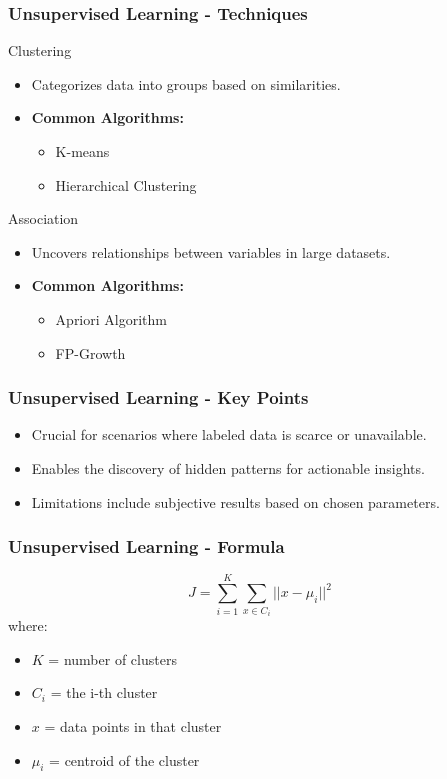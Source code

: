 \documentclass[aspectratio=169]{beamer}
\begin{document}
\begin{frame}[fragile]
    \frametitle{Unsupervised Learning - Techniques}
    \begin{block}{Clustering}
        \begin{itemize}
            \item Categorizes data into groups based on similarities.
            \item \textbf{Common Algorithms:}
            \begin{itemize}
                \item K-means
                \item Hierarchical Clustering
            \end{itemize}
        \end{itemize}
    \end{block}
    
    \begin{block}{Association}
        \begin{itemize}
            \item Uncovers relationships between variables in large datasets.
            \item \textbf{Common Algorithms:}
            \begin{itemize}
                \item Apriori Algorithm
                \item FP-Growth
            \end{itemize}
        \end{itemize}
    \end{block}
\end{frame}

\begin{frame}[fragile]
    \frametitle{Unsupervised Learning - Key Points}
    \begin{itemize}
        \item Crucial for scenarios where labeled data is scarce or unavailable.
        \item Enables the discovery of hidden patterns for actionable insights.
        \item Limitations include subjective results based on chosen parameters.
    \end{itemize}
\end{frame}

\begin{frame}[fragile]
    \frametitle{Unsupervised Learning - Formula}
    \begin{equation}
        J = \sum_{i=1}^{K} \sum_{x \in C_i} ||x - \mu_i||^2
    \end{equation}
    where:
    \begin{itemize}
        \item $K$ = number of clusters
        \item $C_i$ = the i-th cluster
        \item $x$ = data points in that cluster
        \item $\mu_i$ = centroid of the cluster
    \end{itemize}
\end{frame}
\end{document}
